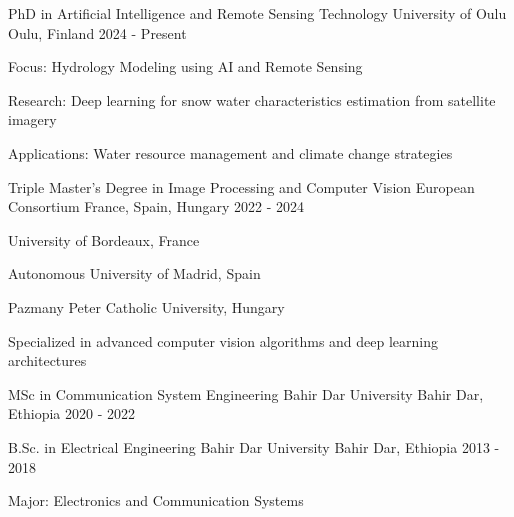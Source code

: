 \documentclass[13pt, a4paper]{awesome-cv}
\begin{document}
\begin{cventries}
  \cventry
    {PhD in Artificial Intelligence and Remote Sensing Technology} %
    {University of Oulu} %
    {Oulu, Finland} %
    {2024 - Present} %
    {
      \begin{cvitems} %
        \item {Focus: Hydrology Modeling using AI and Remote Sensing}
        \item {Research: Deep learning for snow water characteristics estimation from satellite imagery}
        \item {Applications: Water resource management and climate change strategies}
      \end{cvitems}
    }

  \cventry
    {Triple Master's Degree in Image Processing and Computer Vision} %
    {European Consortium} %
    {France, Spain, Hungary} %
    {2022 - 2024} %
    {
      \begin{cvitems} %
        \item {University of Bordeaux, France}
        \item {Autonomous University of Madrid, Spain}
        \item {Pazmany Peter Catholic University, Hungary}
        \item {Specialized in advanced computer vision algorithms and deep learning architectures}
      \end{cvitems}
    }

  \cventry
    {MSc in Communication System Engineering} %
    {Bahir Dar University} %
    {Bahir Dar, Ethiopia} %
    {2020 - 2022} %
    {}

  \cventry
    {B.Sc. in Electrical Engineering} %
    {Bahir Dar University} %
    {Bahir Dar, Ethiopia} %
    {2013 - 2018} %
    {
      \begin{cvitems}
        \item {Major: Electronics and Communication Systems}
      \end{cvitems}
    }
\end{cventries}
\end{document}
